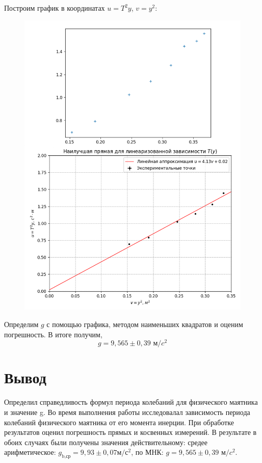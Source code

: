 \documentclass[a4paper,12pt]{article}
\begin{document}
Построим график в координатах $u=T^2y$, $v = y^2$:
\begin{figure}[H]
\begin{center}
\includegraphics[width=1\textwidth]{U(v)}
\end{center}
\end{figure}

Определим $g$ с помощью графика, методом наименьших квадратов и оценим погрешность. В итоге получим, \[g=9,565 \pm 0,39 \mbox{ м/}c^2\]

\section{Вывод}
Определил справедливость формул периода колебаний для физического маятника и значение g. Во время выполнения работы исследовалал зависимость периода колебаний физического маятника от его момента инерции. При обработке результатов оценил погрешность прямых и косвенных измерений. В результате в обоих случаях были получены значения действительному: средее арифметическое: $g_{\mbox{b,ср}} = 9,93\pm 0,07 м/с^2$, по МНК: $g=9,565 \pm 0,39 \mbox{ м/}c^2$.
\end{document}
